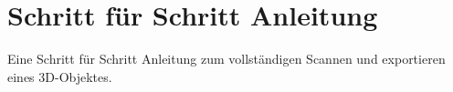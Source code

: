 \section{Schritt für Schritt Anleitung}
\label{sec:ListeBPELAktivitaeten}

Eine Schritt für Schritt Anleitung zum vollständigen Scannen und exportieren eines 3D-Objektes.

